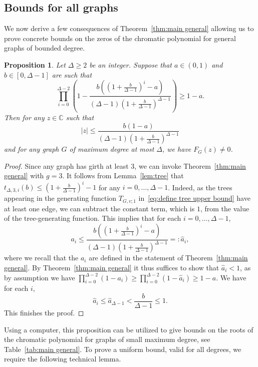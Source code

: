 \documentclass[a4paper,11pt,reqno]{amsart}
\newtheorem{proposition}[corollary]{Proposition}
\numberwithin{equation}{section}
\begin{document}
\subsection{Bounds for all graphs}
We now derive a few consequences of Theorem~\ref{thm:main general} allowing us to prove concrete bounds on the zeros of the chromatic polynomial for general graphs of bounded degree.

\begin{proposition}\label{prop:bound general}
Let $\Delta\geq 2$ be an integer. %
Suppose that $a\in (0,1)$ and $b\in [0,\Delta-1]$ are such that
\[
    \prod_{i=0}^{\Delta-2} \left(1-\frac{b\left((1+\tfrac{b}{\Delta-1})^i-a\right)}{(\Delta-1) \left(1+\tfrac{b}{\Delta-1}\right)^{\Delta-1}}\right) \geq 1-a.
\]
Then for any $z\in \mathbb{C}$ such that 
\[|z|\leq \frac{b(1-a)}{(\Delta-1)(1+\tfrac{b}{\Delta-1})^{\Delta-1}}\]
and for any graph $G$ of maximum degree at most $\Delta$, we have $F_G(z)\neq 0$.
\end{proposition}
\begin{proof}
Since any graph has girth at least $3$, we can invoke Theorem~\ref{thm:main general} with $g=3$.
It follows from Lemma~\ref{lem:tree} that $t_{\Delta,3,i}(b)\leq (1+\tfrac{b}{\Delta-1})^i-1$ for any $i=0,\ldots, \Delta-1$. Indeed, as the trees appearing in the generating function $T_{G,v;1}$ in~\eqref{eq:define tree upper bound} have at least one edge, we can subtract the constant term, which is $1$, from the value of the tree-generating function.
This implies that for each $i=0,\ldots,\Delta-1$, 
\[
a_i\leq \frac{b\left((1+\tfrac{b}{\Delta-1})^i-a\right)}{(\Delta-1) \left(1+\tfrac{b}{\Delta-1}\right)^{\Delta-1}}=:\hat{a}_i,
\]
where we recall that the $a_i$ are defined in the statement of Theorem~\ref{thm:main general}.
By Theorem~\ref{thm:main general} it thus suffices to show that $\hat{a}_i<1$, as by assumption we have $\prod_{i=0}^{\Delta-2}(1-a_i)\geq \prod_{i=0}^{\Delta-2} (1-\hat{a}_i)\geq 1-a$.
We have for each $i$, 
\[\hat{a}_i\leq \hat{a}_{\Delta-1}<\frac{b}{\Delta-1}\leq 1.
\]
This finishes the proof.
\end{proof}

Using a computer, this proposition can be utilized to give bounds on the roots of the chromatic polynomial for graphs of small maximum degree, see Table~\ref{tab:main general}.
To prove a uniform bound, valid for all degrees, we require the following technical lemma.
\end{document}
